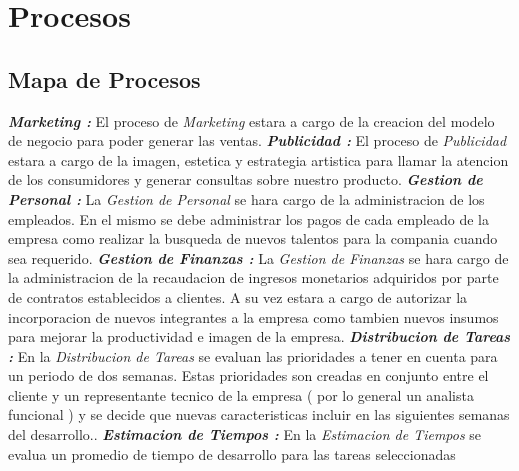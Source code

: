 \documentclass[
10pt, %
a4paper, %
oneside, %
headinclude,footinclude, %
BCOR5mm, %
]{scrartcl}
\begin{document}
\section{Procesos}
\subsection{Mapa de Procesos}
  

  \begin{flushleft}
  \textbf{ \emph{Marketing : } } El proceso de \textit{Marketing} estara
  a cargo de la creacion del modelo de negocio para poder generar las ventas.
\pagebreak
  \textbf{ \emph{Publicidad : } } El proceso de \textit{Publicidad} estara
  a cargo de la imagen, estetica y estrategia artistica para llamar la atencion
  de los consumidores y generar consultas sobre nuestro producto.
   \newline \newline
  \textbf{ \emph{Gestion de Personal : } } La \textit{Gestion de Personal}
  se hara cargo de la administracion de los empleados. En el mismo se debe
  administrar los pagos de cada empleado de la empresa como realizar la busqueda
  de nuevos talentos para la compania cuando sea requerido.
   \newline \newline
  \textbf{ \emph{Gestion de Finanzas : } } La \textit{Gestion  de Finanzas} se
   hara cargo de la administracion de la recaudacion de ingresos monetarios
   adquiridos por parte de contratos establecidos a clientes. A su vez
   estara a cargo de autorizar la incorporacion de nuevos integrantes a la
   empresa como tambien nuevos insumos para mejorar la productividad e
   imagen de la empresa.
   \newline \newline
  \textbf{ \emph{Distribucion de Tareas : } } En la \textit{Distribucion de Tareas}
  se evaluan las prioridades a tener en cuenta para un periodo de dos semanas.
  Estas prioridades son creadas en conjunto entre el cliente y un representante
  tecnico de la empresa ( por lo general un analista funcional ) y se decide
  que nuevas caracteristicas incluir en las siguientes semanas del desarrollo..
  \newline  \newline
  \textbf{ \emph{Estimacion de Tiempos : } } En la \textit{Estimacion de Tiempos}
  se evalua un promedio de tiempo de desarrollo  para las tareas seleccionadas

\end{flushleft}
\end{document}
